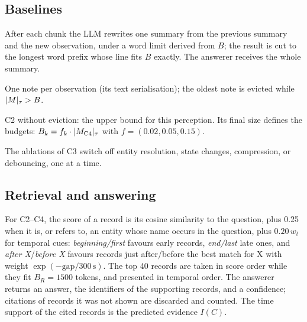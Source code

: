 \subsection{Baselines}
\begin{description}[nosep]
\item[C1 rolling summary.] After each chunk the LLM rewrites one summary from
  the previous summary and the new observation, under a word limit derived
  from $B$; the result is cut to the longest word prefix whose line fits $B$
  exactly. The answerer receives the whole summary.
\item[C2 flat log.] One note per observation (its text serialisation);
  the oldest note is evicted while $\lvert M \rvert_{\tau}>B$.
\item[C4 unbounded log.] C2 without eviction: the upper bound for this
  perception. Its final size defines the budgets: $B_k=f_k\cdot\lvert M_{\mathrm{C4}} \rvert_{\tau}$
  with $f=(0.02,0.05,0.15)$.
\end{description}
The ablations of C3 switch off entity resolution, state changes, compression,
or debouncing, one at a time.

\subsection{Retrieval and answering}\label{sec:retrieval}
For C2--C4, the score of a record is its cosine similarity to the question,
plus 0.25 when it is, or refers to, an entity whose name occurs in the
question, plus $0.20\,w_t$ for temporal cues: \emph{beginning/first} favours
early records, \emph{end/last} late ones, and \emph{after X}/\emph{before X}
favours records just after/before the best match for X with weight
$\exp(-\text{gap}/300\,\mathrm{s})$. The top 40 records are taken in score
order while they fit $B_R=1500$ tokens, and presented in temporal order. The
answerer returns an answer, the identifiers of the supporting records, and a
confidence; citations of records it was not shown are discarded and counted.
The time support of the cited records is the predicted evidence $I(C)$.
